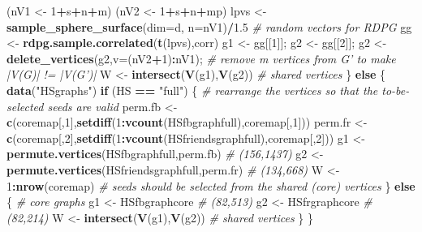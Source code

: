 \documentclass[]{article}
\newenvironment{Shaded}{\begin{snugshade}}{\end{snugshade}}
\newcommand{\KeywordTok}[1]{\textcolor[rgb]{0.13,0.29,0.53}{\textbf{#1}}}
\newcommand{\DataTypeTok}[1]{\textcolor[rgb]{0.13,0.29,0.53}{#1}}
\newcommand{\DecValTok}[1]{\textcolor[rgb]{0.00,0.00,0.81}{#1}}
\newcommand{\FloatTok}[1]{\textcolor[rgb]{0.00,0.00,0.81}{#1}}
\newcommand{\StringTok}[1]{\textcolor[rgb]{0.31,0.60,0.02}{#1}}
\newcommand{\CommentTok}[1]{\textcolor[rgb]{0.56,0.35,0.01}{\textit{#1}}}
\newcommand{\ControlFlowTok}[1]{\textcolor[rgb]{0.13,0.29,0.53}{\textbf{#1}}}
\newcommand{\OperatorTok}[1]{\textcolor[rgb]{0.81,0.36,0.00}{\textbf{#1}}}
\newcommand{\NormalTok}[1]{#1}
\begin{document}
\begin{Shaded}
\begin{Highlighting}[]
\NormalTok{    (nV1 <-}\StringTok{ }\DecValTok{1}\OperatorTok{+}\NormalTok{s}\OperatorTok{+}\NormalTok{n}\OperatorTok{+}\NormalTok{m)}
\NormalTok{    (nV2 <-}\StringTok{ }\DecValTok{1}\OperatorTok{+}\NormalTok{s}\OperatorTok{+}\NormalTok{n}\OperatorTok{+}\NormalTok{mp)}
\NormalTok{    lpvs <-}\StringTok{ }\KeywordTok{sample_sphere_surface}\NormalTok{(}\DataTypeTok{dim=}\NormalTok{d, }\DataTypeTok{n=}\NormalTok{nV1)}\OperatorTok{/}\FloatTok{1.5} \CommentTok{# random vectors for RDPG}
\NormalTok{    gg <-}\StringTok{ }\KeywordTok{rdpg.sample.correlated}\NormalTok{(}\KeywordTok{t}\NormalTok{(lpvs),corr)}
\NormalTok{    g1 <-}\StringTok{ }\NormalTok{gg[[}\DecValTok{1}\NormalTok{]]; }
\NormalTok{    g2 <-}\StringTok{ }\NormalTok{gg[[}\DecValTok{2}\NormalTok{]]; }
\NormalTok{    g2 <-}\StringTok{ }\KeywordTok{delete_vertices}\NormalTok{(g2,}\DataTypeTok{v=}\NormalTok{(nV2}\OperatorTok{+}\DecValTok{1}\NormalTok{)}\OperatorTok{:}\NormalTok{nV1); }\CommentTok{# remove m vertices from G' to make |V(G)| != |V(G')|}
\NormalTok{    W <-}\StringTok{ }\KeywordTok{intersect}\NormalTok{(}\KeywordTok{V}\NormalTok{(g1),}\KeywordTok{V}\NormalTok{(g2)) }\CommentTok{# shared vertices}
\NormalTok{\} }\ControlFlowTok{else}\NormalTok{ \{}
    \KeywordTok{data}\NormalTok{(}\StringTok{"HSgraphs"}\NormalTok{)}
    \ControlFlowTok{if}\NormalTok{ (HS }\OperatorTok{==}\StringTok{ "full"}\NormalTok{) \{}
        \CommentTok{# rearrange the vertices so that the to-be-selected seeds are valid}
\NormalTok{        perm.fb <-}\StringTok{ }\KeywordTok{c}\NormalTok{(coremap[,}\DecValTok{1}\NormalTok{],}\KeywordTok{setdiff}\NormalTok{(}\DecValTok{1}\OperatorTok{:}\KeywordTok{vcount}\NormalTok{(HSfbgraphfull),coremap[,}\DecValTok{1}\NormalTok{]))}
\NormalTok{        perm.fr <-}\StringTok{ }\KeywordTok{c}\NormalTok{(coremap[,}\DecValTok{2}\NormalTok{],}\KeywordTok{setdiff}\NormalTok{(}\DecValTok{1}\OperatorTok{:}\KeywordTok{vcount}\NormalTok{(HSfriendsgraphfull),coremap[,}\DecValTok{2}\NormalTok{]))}
\NormalTok{        g1 <-}\StringTok{ }\KeywordTok{permute.vertices}\NormalTok{(HSfbgraphfull,perm.fb) }\CommentTok{# (156,1437)}
\NormalTok{        g2 <-}\StringTok{ }\KeywordTok{permute.vertices}\NormalTok{(HSfriendsgraphfull,perm.fr) }\CommentTok{# (134,668)}
\NormalTok{        W <-}\StringTok{ }\DecValTok{1}\OperatorTok{:}\KeywordTok{nrow}\NormalTok{(coremap) }\CommentTok{# seeds should be selected from the shared (core) vertices}
\NormalTok{    \} }\ControlFlowTok{else}\NormalTok{ \{ }\CommentTok{# core graphs}
\NormalTok{        g1 <-}\StringTok{ }\NormalTok{HSfbgraphcore }\CommentTok{# (82,513)}
\NormalTok{        g2 <-}\StringTok{ }\NormalTok{HSfrgraphcore }\CommentTok{# (82,214)}
\NormalTok{        W <-}\StringTok{ }\KeywordTok{intersect}\NormalTok{(}\KeywordTok{V}\NormalTok{(g1),}\KeywordTok{V}\NormalTok{(g2)) }\CommentTok{# shared vertices}
\NormalTok{    \}}
\NormalTok{\}}
\end{Highlighting}
\end{Shaded}
\end{document}
